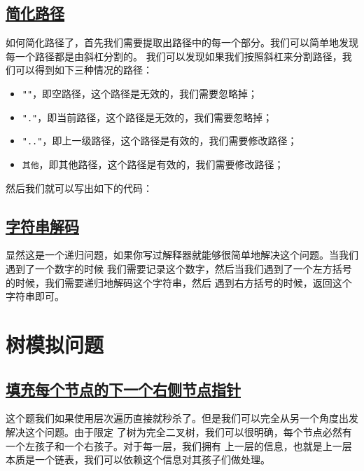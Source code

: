 \documentclass[../../main.tex]{subfiles}
\begin{document}
\subsection{\href{https://leetcode.cn/problems/simplify-path/}{简化路径}}

如何简化路径了，首先我们需要提取出路径中的每一个部分。我们可以简单地发现每一个路径都是由斜杠分割的。
我们可以发现如果我们按照斜杠来分割路径，我们可以得到如下三种情况的路径：

\begin{itemize}
  \item \texttt{""}，即空路径，这个路径是无效的，我们需要忽略掉；
  \item \texttt{"."}，即当前路径，这个路径是无效的，我们需要忽略掉；
  \item \texttt{".."}，即上一级路径，这个路径是有效的，我们需要修改路径；
  \item \texttt{其他}，即其他路径，这个路径是有效的，我们需要修改路径；
\end{itemize}

然后我们就可以写出如下的代码：



\subsection{\href{https://leetcode.cn/problems/decode-string/}{字符串解码}}

显然这是一个递归问题，如果你写过解释器就能够很简单地解决这个问题。当我们遇到了一个数字的时候
我们需要记录这个数字，然后当我们遇到了一个左方括号的时候，我们需要递归地解码这个字符串，然后
遇到右方括号的时候，返回这个字符串即可。



\section{树模拟问题}

\subsection{\href{https://leetcode.cn/problems/populating-next-right-pointers-in-each-node/}
{填充每个节点的下一个右侧节点指针}}

这个题我们如果使用层次遍历直接就秒杀了。但是我们可以完全从另一个角度出发解决这个问题。由于限定
了树为完全二叉树，我们可以很明确，每个节点必然有一个左孩子和一个右孩子。对于每一层，我们拥有
上一层的信息，也就是上一层本质是一个链表，我们可以依赖这个信息对其孩子们做处理。
\end{document}
